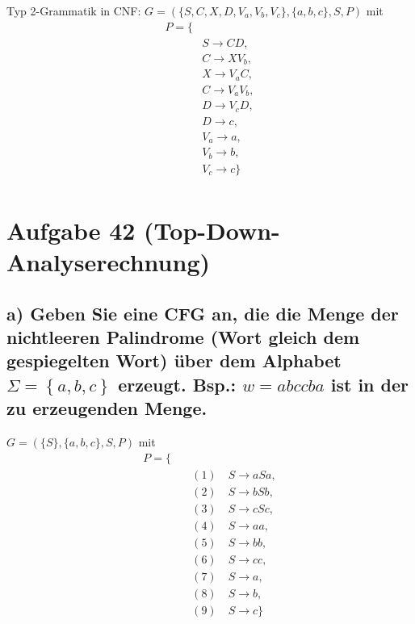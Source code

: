 \documentclass{article}
\begin{document}
Typ 2-Grammatik in CNF:
$G = (\{S, C, X, D, V_a, V_b, V_c\}, \{a, b, c\}, S, P)$ mit
\begin{equation}
\begin{split}
P = \{ \\\
&S \rightarrow CD, \\
&C \rightarrow XV_b, \\\
&X \rightarrow V_aC, \\\
&C \rightarrow V_aV_b, \\\
&D \rightarrow V_cD, \\\
&D \rightarrow c, \\\
&V_a \rightarrow a, \\\
&V_b \rightarrow b, \\\
&V_c \rightarrow c \} \\\
\end{split}
\end{equation}


\newpage
\section*{Aufgabe 42 (Top-Down-Analyserechnung)}

\subsection*{a) Geben Sie eine CFG an, die die Menge der nichtleeren Palindrome (Wort gleich dem gespiegelten Wort) über dem Alphabet $\Sigma = \left\{a, b, c\right\}$ erzeugt. Bsp.: $w=abccba$ ist in der zu erzeugenden Menge.}

$G = (\{S\}, \{a, b, c\}, S, P)$ mit
\begin{equation}
\begin{split}
P = \{ \\\
&\quad (1) \quad S \rightarrow aSa, \\\ 
&\quad (2) \quad S \rightarrow bSb, \\\
&\quad (3) \quad S \rightarrow cSc, \\\
&\quad (4) \quad S \rightarrow aa, \\\
&\quad (5) \quad S \rightarrow bb, \\\
&\quad (6) \quad S \rightarrow cc, \\\
&\quad (7) \quad S \rightarrow a, \\\
&\quad (8) \quad S \rightarrow b, \\\
&\quad (9) \quad S \rightarrow c \} \\\
\end{split}
\end{equation}
\end{document}
